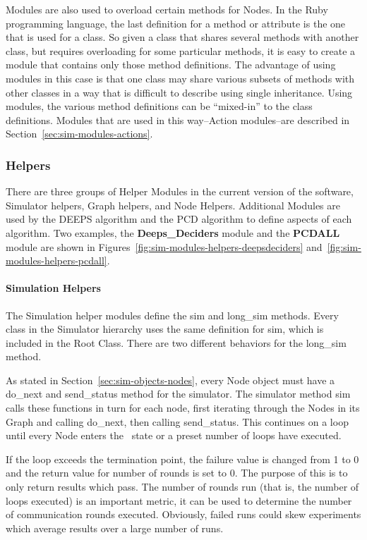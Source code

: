 Modules are also used to overload certain methods for Nodes. In the Ruby programming language, the last definition for a method or attribute is the one that is used for a class. So given a class that shares several methods with another class, but requires overloading for some particular methods, it is easy to create a module that contains only those method definitions. The advantage of using modules in this case is that one class may share various subsets of methods with other classes in a way that is difficult to describe using single inheritance. Using modules, the various method definitions can be ``mixed-in'' to the class definitions. Modules that are used in this way--Action modules--are described in Section~\ref{sec:sim-modules-actions}.

\subsubsection{Helpers}
\label{sec:sim-modules-helpers}
There are three groups of Helper Modules in the current version of the software, Simulator helpers, Graph helpers, and Node Helpers. Additional Modules are used by the DEEPS algorithm and the PCD algorithm to define aspects of each algorithm. Two examples, the {\bfseries Deeps\_Deciders} module and the {\bfseries PCDALL} module are shown in Figures~\ref{fig:sim-modules-helpers-deepsdeciders} and~\ref{fig:sim-modules-helpers-pcdall}. 


\paragraph{Simulation Helpers}
\label{sec:sim-helpers-simulation}

The Simulation helper modules define the {\ttfamily sim} and {\ttfamily long\_sim} methods. Every class in the Simulator hierarchy uses the same definition for {\ttfamily sim}, which is included in the Root Class. There are two different behaviors for the {\ttfamily long\_sim} method. 

As stated in Section~\ref{sec:sim-objects-nodes}, every Node object must have a {\ttfamily do\_next} and {\ttfamily send\_status} method for the simulator. The simulator method {\ttfamily sim} calls these functions in turn for each node, first iterating through the Nodes in its Graph and calling {\ttfamily do\_next}, then calling {\ttfamily send\_status}. This continues on a loop until every Node enters the \cDd\ state or a preset number of loops have executed. 

If the loop exceeds the termination point, the failure value is changed from 1 to 0 and the return value for number of rounds is set to 0. The purpose of this is to only return results which pass. The number of rounds run (that is, the number of loops executed) is an important metric, it can be used to determine the number of communication rounds executed. Obviously, failed runs could skew experiments which average results over a large number of runs.

